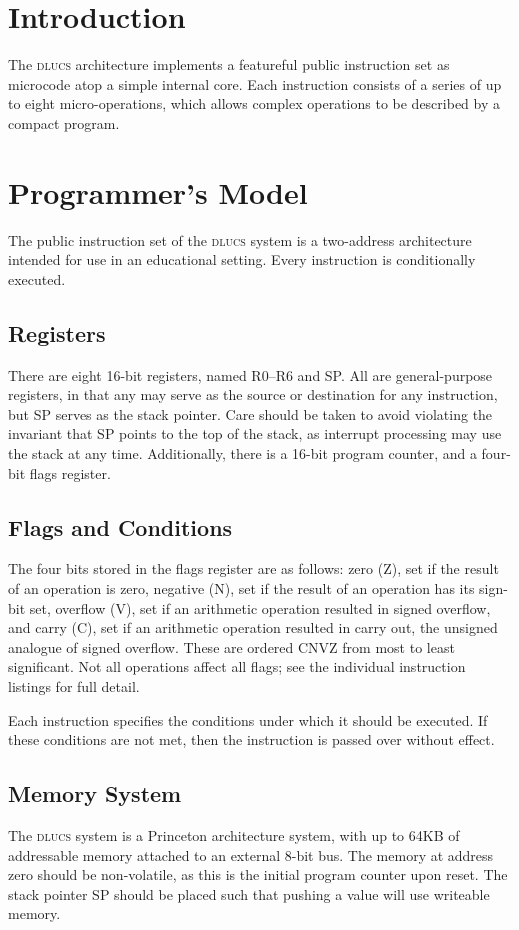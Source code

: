 \documentclass[11pt]{book}
\begin{document}
\section{Introduction}
The \textsc{dlucs} architecture implements
a featureful public instruction set
as microcode atop a simple internal core.
Each instruction consists of a series of up to eight micro-operations,
which allows complex operations to be described by a compact program.

\section{Programmer's Model}
The public instruction set of the \textsc{dlucs} system
is a two-address architecture
intended for use in an educational setting.
Every instruction is conditionally executed.

\subsection{Registers}
There are eight 16-bit registers,
named R0--R6 and SP.
All are general-purpose registers,
in that any may serve as the source or destination
for any instruction,
but SP serves as the stack pointer.
Care should be taken to avoid violating the invariant
that SP points to the top of the stack,
as interrupt processing may use the stack at any time.
Additionally, there is a 16-bit program counter,
and a four-bit flags register.

\subsection{Flags and Conditions}
The four bits stored in the flags register are as follows:
zero (Z), set if the result of an operation is zero,
negative (N), set if the result of an operation has its sign-bit set,
overflow (V), set if an arithmetic operation resulted in signed overflow,
and carry (C), set if an arithmetic operation resulted in carry out,
the unsigned analogue of signed overflow.
These are ordered CNVZ from most to least significant.
Not all operations affect all flags;
see the individual instruction listings for full detail.

Each instruction specifies the conditions
under which it should be executed.
If these conditions are not met,
then the instruction is passed over without effect.

\subsection{Memory System}
The \textsc{dlucs} system is a Princeton architecture system,
with up to 64KB of addressable memory
attached to an external 8-bit bus.
The memory at address zero should be non-volatile,
as this is the initial program counter upon reset.
The stack pointer SP should be placed
such that pushing a value will use writeable memory.
\end{document}
